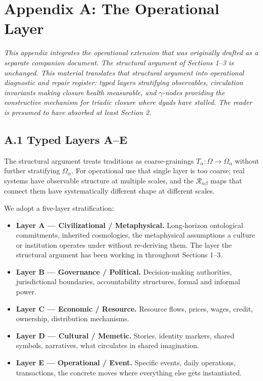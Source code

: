 \documentclass[
]{article}
\providecommand{\tightlist}{%
  \setlength{\itemsep}{0pt}\setlength{\parskip}{0pt}}
\begin{document}
\section{Appendix A: The Operational
Layer}\label{appendix-a-the-operational-layer}

\emph{This appendix integrates the operational extension that was
originally drafted as a separate companion document. The structural
argument of Sections 1--3 is unchanged. This material translates that
structural argument into operational diagnostic and repair register:
typed layers stratifying observables, circulation invariants making
closure health measurable, and \(\gamma\)-nodes providing the
constructive mechanism for triadic closure where dyads have stalled.
The reader is presumed to have absorbed at least Section 2.}

\subsection{A.1 Typed Layers
A--E}\label{appendix-a-typed-layers}

The structural argument treats traditions as coarse-grainings
\(T_\alpha : \Omega \to \Omega_\alpha\) without further stratifying
\(\Omega_\alpha\). For operational use that single layer is too coarse;
real systems have observable structure at multiple scales, and the
\(\mathcal{R}_{\alpha\beta}\) maps that connect them have systematically
different shape at different scales.

We adopt a five-layer stratification:

\begin{itemize}
\tightlist
\item
  \textbf{Layer A --- Civilizational / Metaphysical.} Long-horizon
  ontological commitments, inherited cosmologies, the metaphysical
  assumptions a culture or institution operates under without
  re-deriving them. The layer the structural argument has been working
  in throughout Sections 1--3.
\item
  \textbf{Layer B --- Governance / Political.} Decision-making
  authorities, jurisdictional boundaries, accountability structures,
  formal and informal power.
\item
  \textbf{Layer C --- Economic / Resource.} Resource flows, prices,
  wages, credit, ownership, distribution mechanisms.
\item
  \textbf{Layer D --- Cultural / Memetic.} Stories, identity markers,
  shared symbols, narratives, what circulates in shared imagination.
\item
  \textbf{Layer E --- Operational / Event.} Specific events, daily
  operations, transactions, the concrete moves where everything else
  gets instantiated.
\end{itemize}
\end{document}
